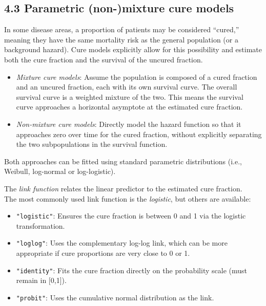 \documentclass[
]{article}
\providecommand{\tightlist}{%
  \setlength{\itemsep}{0pt}\setlength{\parskip}{0pt}}
\begin{document}
\clearpage

\clearpage

\subsection{4.3 Parametric (non-)mixture cure
models}\label{parametric-non-mixture-cure-models}

In some disease areas, a proportion of patients may be considered
``cured,'' meaning they have the same mortality risk as the general
population (or a background hazard). Cure models explicitly allow for
this possibility and estimate both the cure fraction and the survival of
the uncured fraction.

\begin{itemize}
\tightlist
\item
  \emph{Mixture cure models}: Assume the population is composed of a
  cured fraction and an uncured fraction, each with its own survival
  curve. The overall survival curve is a weighted mixture of the two.
  This means the survival curve approaches a horizontal asymptote at the
  estimated cure fraction.\\
\item
  \emph{Non-mixture cure models}: Directly model the hazard function so
  that it approaches zero over time for the cured fraction, without
  explicitly separating the two subpopulations in the survival function.
\end{itemize}

Both approaches can be fitted using standard parametric distributions
(i.e., Weibull, log-normal or log-logistic).

The \emph{link function} relates the linear predictor to the estimated
cure fraction.\\
The most commonly used link function is the \emph{logistic}, but others
are available:

\begin{itemize}
\tightlist
\item
  \texttt{"logistic"}: Ensures the cure fraction is between 0 and 1 via
  the logistic transformation.\\
\item
  \texttt{"loglog"}: Uses the complementary log-log link, which can be
  more appropriate if cure proportions are very close to 0 or 1.\\
\item
  \texttt{"identity"}: Fits the cure fraction directly on the
  probability scale (must remain in {[}0,1{]}).\\
\item
  \texttt{"probit"}: Uses the cumulative normal distribution as the
  link.
\end{itemize}
\end{document}
